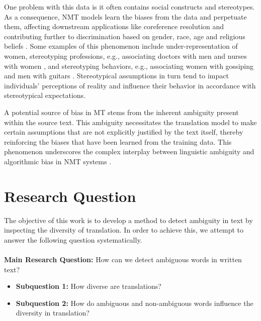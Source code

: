 One problem with this data is it often contains social constructs and stereotypes. As a consequence, NMT models learn the biases from the data and perpetuate them, affecting downstream applications like coreference resolution \parencite{Zhao_2018_coreference} and contributing further to discrimination based on gender, race, age and religious beliefs \parencite{Rudinger_2017}. Some examples of this phenomenon include under-representation of women, stereotyping professions, e.g., associating doctors with men and nurses with women \parencite{Escud_Font_2019}, and stereotyping behaviors, e.g., associating women with gossiping and men with guitars \parencite{Rudinger_2017}. Stereotypical assumptions in turn tend to impact individuals' perceptions of reality and influence their behavior in accordance with stereotypical expectations.

A potential source of bias in MT stems from the inherent ambiguity present within the source text. This ambiguity necessitates the translation model to make certain assumptions that are not explicitly justified by the text itself, thereby reinforcing the biases that have been learned from the training data. This phenomenon underscores the complex interplay between linguistic ambiguity and algorithmic bias in NMT systems \parencite{bias_taxonomy}.

\section{Research Question}
\label{sec:Introduction:Questions}

The objective of this work is to develop a method to detect ambiguity in text by inspecting the diversity of translation. In order to achieve this, we attempt to answer the following question systematically.

\paragraph{} \textbf{Main Research Question:} How can we detect ambiguous words in written text?
\begin{itemize} 
    \item \textbf{Subquestion 1:} How diverse are translations?
    \item \textbf{Subquestion 2:} How do ambiguous and non-ambiguous words influence the diversity in translation? 
\end{itemize}

